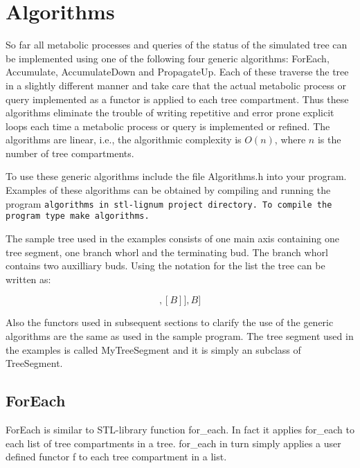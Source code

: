 \section{Algorithms}

So  far all   metabolic processes and   queries  of the  status of the
simulated  tree can be  implemented using  one  of the following  four
generic    algorithms:   ForEach,  Accumulate,   AccumulateDown    and
PropagateUp.  Each of these traverse the tree  in a slightly different
manner  and take   care that  the actual   metabolic process or  query
implemented  as a functor  is applied to  each tree compartment.  Thus
these algorithms eliminate the trouble of writing repetitive and error
prone explicit loops  each time    a  metabolic process or query    is
implemented  or refined.      The algorithms are    linear,  i.e., the
algorithmic  complexity is $O(n)$, where  $n$   is the number of  tree
compartments.

To   use these generic  algorithms  include the file Algorithms.h into
your   program.   Examples of these   algorithms   can be  obtained by
compiling  and running  the  program \tt algorithms  \rm in stl-lignum
project   directory.   To    compile    the program type    \tt   make
algorithms\rm.

The sample  tree  used in  the   examples consists  of one  main  axis
containing one tree segment, one branch whorl and the terminating bud.
The branch whorl contains two  auxilliary buds. Using the notation for
the list the tree can be written as:

\begin{displaymath}
[TS,[[B],[B]],B]
\end{displaymath}

Also the  functors used in subsequent  sections to clarify  the use of
the generic algorithms are the same as used in the sample program. The
tree segment  used in the examples  is called MyTreeSegment  and it is
simply an subclass of TreeSegment.
 
\subsection{ForEach}

ForEach is similar to  STL-library  function  for\_each.  In fact   it
applies  for\_each to  each  list  of  tree  compartments  in a  tree.
for\_each in turn simply applies a user defined functor f to each tree
compartment in a list.

